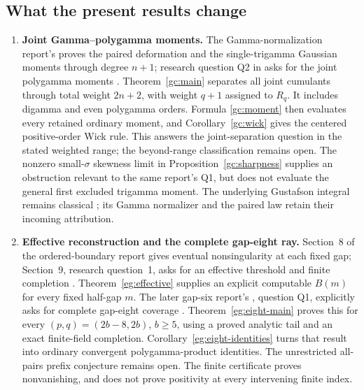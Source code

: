 \documentclass[11pt,a4paper]{article}
\numberwithin{equation}{section}
\theoremstyle{definition}
\theoremstyle{remark}
\begin{document}
\subsection{What the present results change}

\begin{enumerate}
\item \textbf{Joint Gamma--polygamma moments.}
The Gamma-normalization report's
 proves the paired deformation and
the single-trigamma Gaussian moments through degree $n+1$;
research question Q2 in
 asks for the joint
polygamma moments \cite{GammaIncoming}.
Theorem~\ref{gc:main} separates all joint cumulants through total
weight $2n+2$, with weight $q+1$ assigned to $R_q$.
It includes digamma and even polygamma orders. Formula
\eqref{gc:moment} then evaluates every retained ordinary moment,
and Corollary~\ref{gc:wick} gives the centered positive-order Wick
rule. This answers the joint-separation question in the stated
weighted range; the beyond-range classification remains open.
The nonzero small-$\sigma$ skewness limit in
Proposition~\ref{gc:sharpness} supplies an obstruction relevant to
the same report's Q1, but does not evaluate the general first
excluded trigamma moment.
The underlying Gustafson integral remains classical
\cite{DerkachovManashov}; its Gamma normalizer and the paired law
retain their incoming attribution.

\item \textbf{Effective reconstruction and the complete gap-eight ray.}
Section~8 of the ordered-boundary report gives eventual
nonsingularity at each fixed gap; Section~9, research question~1,
asks for an effective threshold and finite completion
\cite{OrderedIncoming}. Theorem~\ref{eg:effective} supplies an
explicit computable $B(m)$ for every fixed half-gap $m$.
The later gap-six report's
, question Q1,
explicitly asks for complete gap-eight coverage \cite{GapSix}.
Theorem~\ref{eg:eight-main} proves this for every
$(p,q)=(2b-8,2b)$, $b\ge5$, using a proved analytic tail and an
exact finite-field completion. Corollary~\ref{eg:eight-identities}
turns that result into ordinary convergent polygamma-product
identities. The unrestricted all-pairs prefix conjecture remains
open. The finite certificate proves nonvanishing, and does not
prove positivity at every intervening finite index.


\end{enumerate}
\end{document}
